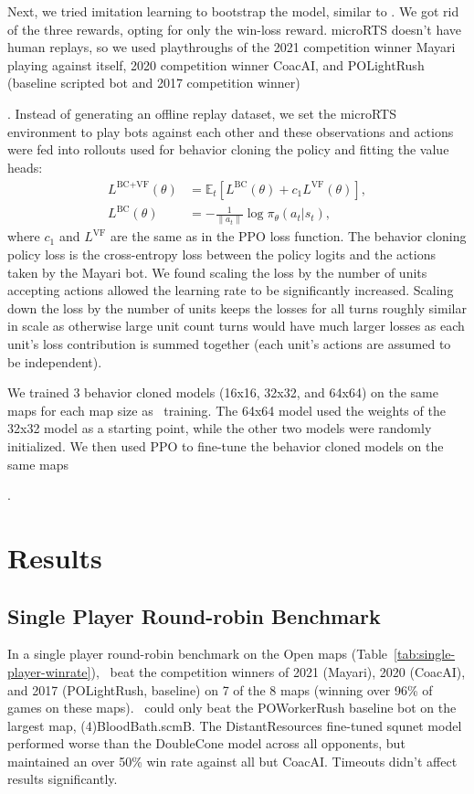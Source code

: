 \documentclass[conference]{IEEEtran}
\newif\ifsupplemental
\newcommand{\supptableref}[1]{%
  \ifsupplemental
    \ (Supplemental Table~\ref{#1})%
  \fi
}
\newcommand{\mapname}[1]{#1} %
\begin{document}
Next, we tried imitation learning to bootstrap the model, similar to
\cite{Vinyals2019GrandmasterLI}. We got rid of the three rewards, opting for only the
win-loss reward. microRTS doesn't have human replays, so we used playthroughs of the
2021 competition winner Mayari playing against itself, 2020 competition winner CoacAI, 
and POLightRush (baseline scripted bot and 2017 competition
winner)\supptableref{tab:bc-training-parameters}.
Instead of generating an offline replay dataset, we set the microRTS environment to play bots
against each other and these observations and actions were fed into rollouts used for
behavior cloning the policy and fitting the value heads:
\begin{align}
    L^{\text{BC+VF}}(\theta) &= \hat{\mathbb{E}}_t \left[ L^{\text{BC}}(\theta) + c_1 L^{\text{VF}}(\theta) \right], \\
    L^{\text{BC}}(\theta) &= -\frac{1}{\|a_t\|} \log \pi_{\theta}(a_t|s_t),
\end{align}
where $c_1$ and $L^{\text{VF}}$ are the same as in the PPO loss function. The behavior cloning
policy loss is the cross-entropy loss between the policy logits and the actions taken by
the Mayari bot. We found scaling the loss by the number of units accepting actions
allowed the learning rate to be significantly increased. Scaling down the loss by the
number of units keeps the losses for all turns roughly similar in scale as otherwise
large unit count turns would have much larger losses as each unit's loss contribution is
summed together (each unit's actions are assumed to be independent).

We trained 3 behavior cloned models (16x16, 32x32, and 64x64) on the same maps for each
map size as \agentName\ training. The 64x64 model used the weights of the 32x32 model 
as a starting point, while the other two models were randomly initialized. We then used 
PPO to fine-tune the behavior cloned models on the same maps\supptableref{tab:bc-ppo-training-parameters}.

\section{Results}
\subsection{Single Player Round-robin Benchmark}
\label{sec:single-player-benchmark}
In a single player round-robin benchmark on the Open maps (Table~\ref{tab:single-player-winrate}), \agentName\
beat the competition winners of 2021 (Mayari), 2020 (CoacAI), and 2017 (POLightRush,
baseline) on 7 of the 8 maps (winning over 96\% of games on these maps). \agentName\
could only beat the POWorkerRush baseline bot on the largest map,
\mapname{(4)BloodBath.scmB}. The DistantResources fine-tuned squnet model performed worse than the DoubleCone model
across all opponents, but maintained an over 50\% win rate against all but CoacAI. Timeouts didn't affect results significantly.
\end{document}

